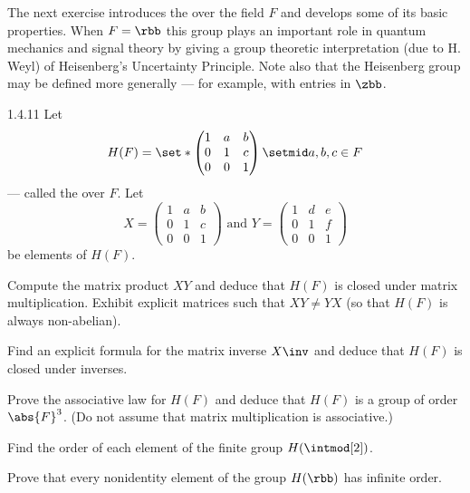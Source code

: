 The next exercise introduces the  over the field $F$ and develops some of its basic properties.
When $F = \rbb$ this group plays an important role in quantum mechanics and signal theory by giving a group theoretic interpretation (due to H. Weyl) of Heisenberg's Uncertainty Principle.
Note also that the Heisenberg group may be defined more generally --- for example, with entries in $\zbb$.

\begin{exercise}{1.4.11}
    Let
    \[
        H(F) = 
        \set*{
            \begin{pmatrix}
                1 & a & b \\
                0 & 1 & c \\
                0 & 0 & 1
            \end{pmatrix} 
            \setmid a, b, c \in F
        }
    \]
    --- called the  over $F$.
	Let
    \[
        X = 
        \begin{pmatrix}
            1 & a & b \\
            0 & 1 & c \\
            0 & 0 & 1
        \end{pmatrix} \text{ and }Y = 
        \begin{pmatrix}
            1 & d & e \\
            0 & 1 & f \\
            0 & 0 & 1
        \end{pmatrix}
    \]
    be elements of $H(F)$.
    \begin{subexercises}
        \item Compute the matrix product $XY$ and deduce that $H(F)$ is closed under matrix multiplication.
	    Exhibit explicit matrices such that $XY \neq YX$ (so that $H(F)$ is always non-abelian).
        \item Find an explicit formula for the matrix inverse $X\inv$ and deduce that $H(F)$ is closed under inverses.
        \item Prove the associative law for $H(F)$ and deduce that $H(F)$ is a group of order $\abs{F}^3$. (Do not assume that matrix multiplication is associative.)
        \item Find the order of each element of the finite group $H(\intmod[2])$.
        \item Prove that every nonidentity element of the group $H(\rbb)$ has infinite order.
    \end{subexercises}
\end{exercise}

